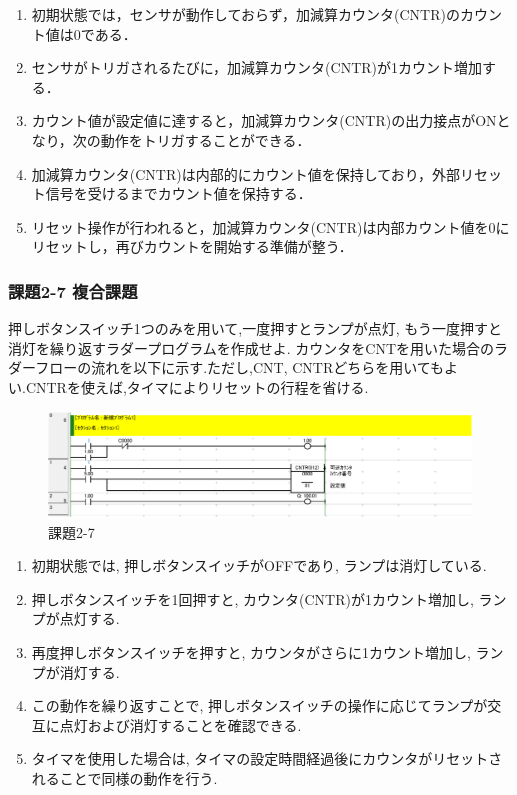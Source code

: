 \begin{enumerate}
  \item 初期状態では，センサが動作しておらず，加減算カウンタ(CNTR)のカウント値は0である．
  \item センサがトリガされるたびに，加減算カウンタ(CNTR)が1カウント増加する．
  \item カウント値が設定値に達すると，加減算カウンタ(CNTR)の出力接点がONとなり，次の動作をトリガすることができる．
  \item 加減算カウンタ(CNTR)は内部的にカウント値を保持しており，外部リセット信号を受けるまでカウント値を保持する．
  \item リセット操作が行われると，加減算カウンタ(CNTR)は内部カウント値を0にリセットし，再びカウントを開始する準備が整う．
\end{enumerate}


\subsubsection*{課題2-7 複合課題}
押しボタンスイッチ1つのみを用いて,一度押すとランプが点灯,
もう一度押すと消灯を繰り返すラダープログラムを作成せよ.
カウンタをCNTを用いた場合のラダーフローの流れを以下に示す.ただし,CNT,
CNTRどちらを用いてもよい.CNTRを使えば,タイマによりリセットの行程を省ける.
\begin{figure}[H]
  \centering
  \includegraphics[scale=1]{sozai/2-7-crop.pdf}
  \caption{課題2-7}
\end{figure}
\begin{enumerate}
  \item 初期状態では, 押しボタンスイッチがOFFであり, ランプは消灯している.
  \item 押しボタンスイッチを1回押すと, カウンタ(CNTR)が1カウント増加し, ランプが点灯する.
  \item 再度押しボタンスイッチを押すと, カウンタがさらに1カウント増加し, ランプが消灯する.
  \item この動作を繰り返すことで, 押しボタンスイッチの操作に応じてランプが交互に点灯および消灯することを確認できる.
  \item タイマを使用した場合は, タイマの設定時間経過後にカウンタがリセットされることで同様の動作を行う.
\end{enumerate}


